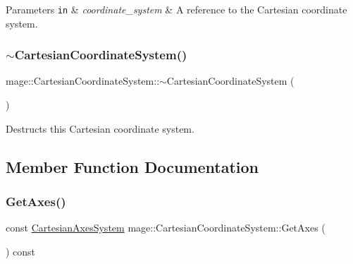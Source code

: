 \begin{DoxyParams}[1]{Parameters}
\mbox{\tt in}  & {\em coordinate\+\_\+system} & A reference to the Cartesian coordinate system. \\
\hline
\end{DoxyParams}
\hypertarget{structmage_1_1_cartesian_coordinate_system_a86effcef63e455323c194063c0f1fd46}{}\label{structmage_1_1_cartesian_coordinate_system_a86effcef63e455323c194063c0f1fd46} 
\subsubsection{\texorpdfstring{$\sim$\+Cartesian\+Coordinate\+System()}{~CartesianCoordinateSystem()}}
{\footnotesize\ttfamily mage\+::\+Cartesian\+Coordinate\+System\+::$\sim$\+Cartesian\+Coordinate\+System (\begin{DoxyParamCaption}{ }\end{DoxyParamCaption})\hspace{0.3cm}{\ttfamily [default]}}

Destructs this Cartesian coordinate system. 

\subsection{Member Function Documentation}
\hypertarget{structmage_1_1_cartesian_coordinate_system_ae329f2a0d4d3a4c96d745d3af10fcaad}{}\label{structmage_1_1_cartesian_coordinate_system_ae329f2a0d4d3a4c96d745d3af10fcaad} 
\subsubsection{\texorpdfstring{Get\+Axes()}{GetAxes()}}
{\footnotesize\ttfamily const \hyperlink{structmage_1_1_cartesian_axes_system}{Cartesian\+Axes\+System} mage\+::\+Cartesian\+Coordinate\+System\+::\+Get\+Axes (\begin{DoxyParamCaption}{ }\end{DoxyParamCaption}) const\hspace{0.3cm}{\ttfamily [noexcept]}}

